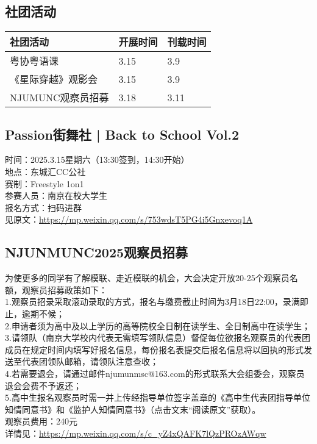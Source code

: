 \documentclass[letterpaper, 12pt]{article}
\begin{document}
\begin{multicols}{2}
\section{社团活动}
\begin{tabular}{|>{\centering\arraybackslash}m{}|m{}|m{}|}
    \hline
    社团活动 & 开展时间 & 刊载时间\\
    \hline\hline
    粤协粤语课 & 3.15 & 3.9\\
    《星际穿越》观影会 & 3.15 & 3.9\\
    NJUMUNC观察员招募 & 3.18 & 3.11\\
    \hline
\end{tabular}
\subsection{Passion街舞社 | Back to School Vol.2}
时间：2025.3.15星期六（13:30签到，14:30开始）\\
地点：东城汇CC公社\\
赛制：Freestyle 1on1\\
参赛人员：南京在校大学生\\
报名方式：扫码进群\\
见原文：\url{https://mp.weixin.qq.com/s/753wdsT5PG4i5Gnxevoq1A}\\
\subsection{NJUNMUNC2025观察员招募}
为使更多的同学有了解模联、走近模联的机会，大会决定开放20-25个观察员名额，观察员招募政策如下：\\
1.观察员招录采取滚动录取的方式，报名与缴费截止时间为3月18日22:00，录满即止，逾期不候；\\
2.申请者须为高中及以上学历的高等院校全日制在读学生、全日制高中在读学生；\\
3.请领队（南京大学校内代表无需填写领队信息）督促每位欲报名观察员的代表团成员在规定时间内填写好报名信息，每份报名表提交后报名信息将以回执的形式发送至代表团领队邮箱，请领队注意查收；\\
4.若需要退会，请通过邮件njumunmsc@163.com的形式联系大会组委会，观察员退会会费不予返还；\\
5.高中生报名观察员时需一并上传经指导单位签字盖章的《高中生代表团指导单位知情同意书》和《监护人知情同意书》（点击文末“阅读原文”获取）。\\
观察员费用：240元\\
详情见：\url{https://mp.weixin.qq.com/s/c_yZ4xQAFK7lQzPROzAWqw}
\end{multicols}
\end{document}
